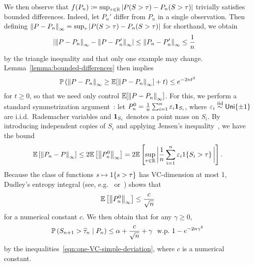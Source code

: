 \documentclass[11pt]{article}
\newcommand{\scorefunc}{s}
\newcommand{\scoreval}{\scorefunc}
\newcommand{\scorerv}{S}
\begin{document}
We then observe that $f(P_n) \defeq \sup_{\tau \in \R} |P(\scorerv > \tau) -
P_n(\scorerv > \tau)|$ trivially satisfies bounded differences.
%
Indeed, let $P_n'$ differ from $P_n$ in a single observation.
%
Then
defining $\linf{P - P_n} = \sup_\tau |P(\scorerv > \tau)
- P_n(\scorerv > \tau)|$ for shorthand, we obtain
\begin{align*}
  \left|\left\|{P - P_n}\right\|_\infty - \left\|{P - P_n'}\right\|_\infty\right|
  & \le
  \left\|{P_n - P_n'}\right\|_\infty
  \le \frac{1}{n}
\end{align*}
by the triangle inequality and that only one example may change.
%
Lemma~\ref{lemma:bounded-differences} then implies
\begin{align*}
  \mathbb{P}\left(\left\|{P - P_n}\right\|_\infty \ge \mathbb{E}[\left\|{P - P_n}\right\|_\infty]
  + t \right) \le e^{-2nt^2}
\end{align*}
for $t \ge 0$, so that we need only control $\mathbb{E}[\left\|{P - P_n}\right\|_\infty]$.
%
For this, we perform a standard symmetrization
argument~\cite[e.g.][Ch.~2.3]{VanDerVaartWe96}: let $P_n^0 = \frac{1}{n}
\sum_{i = 1}^n \varepsilon_i \pointmass_{\scorerv_i}$, where $\varepsilon_i
\stackrel{\rm iid}{\sim} \mathsf{Uni}\{\pm 1\}$ are i.i.d.\ Rademacher variables
and $\pointmass_{\scorerv_i}$ denotes a point mass on $\scorerv_i$.
%
By introducing independent copies of $\scorerv_i$
and applying Jensen's inequality~\cite[Lemma 2.3.1]{VanDerVaartWe96},
we have the bound
\begin{equation*}
  \E\left[\linf{P_n - P}\right]
  \le 2 \E\left[\linf{P_n^0}\right]
  = 2 \E\left[\sup_{\tau \in \R} \bigg|\frac{1}{n}
    \sum_{i = 1}^n \varepsilon_i \indic{\scorerv_i > \tau}
    \bigg|\right].
\end{equation*}
Because the class of functions $\scoreval \mapsto \indic{\scoreval > \tau}$
has VC-dimension at most 1, Dudley's entropy
integral (see, e.g.~\cite[Corollary 2.2.8 and Thm.~2.6.7]{VanDerVaartWe96}
or~\cite[Eq.~(5.5.1)]{Wainwright19}) shows that
\begin{equation*}
  \mathbb{E}\left[\left\|{P_n^0}\right\|_\infty\right]
  \le \frac{c}{\sqrt{n}}
\end{equation*}
for a numerical constant $c$.
%
We then obtain that for any $\gamma \ge 0$,
\begin{align*}
  \P\left(\scorerv_{n + 1} > \what{\tau}_n \mid P_n\right)
  \le \alpha + \frac{c}{\sqrt{n}} + \gamma
  ~~ \mbox{w.p.}~
  1 - e^{-2n \gamma^2}
\end{align*}
by the inequalities~\eqref{eqn:one-VC-simple-deviation}, where
$c$ is a numerical constant.
\end{document}
